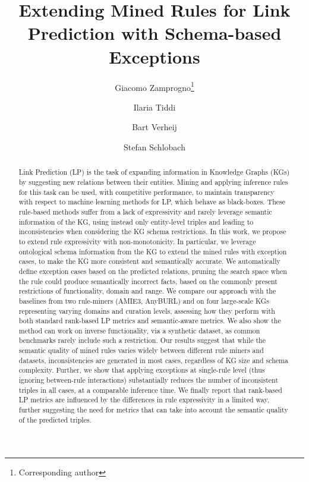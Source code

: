 \documentclass[a4paper,UKenglish,cleveref, autoref, thm-restate]{tgdk-v2021}
\title{Extending Mined Rules for Link Prediction with Schema-based Exceptions}
\author{Giacomo {Zamprogno}\footnote{Corresponding author}}{Vrije Universiteit Amsterdam, The Netherlands}{g.zamprogno@vu.nl}{https://orcid.org/0009-0009-6474-1987}{This work is supported by the Hybrid Intelligence programme (https://www.hybrid-intelligence-centre.nl/), funded by a 10-year Zwaartekracht grant from the Dutch Ministry of Education, Culture and Science (NWO).}%
\author{Ilaria Tiddi}{Vrije Universiteit Amsterdam, The Netherlands}{i.tiddi@vu.nl}{https://orcid.org/0000-0001-7116-9338}{}
\author{Bart Verheij}{University of Groningen, The Netherlands}{Bart.Verheij@rug.nl}{https://orcid.org/0000-0001-8927-8751}{}
\author{Stefan Schlobach}{Vrije Universiteit Amsterdam, The Netherlands}{k.s.schlobach@vu.nl}{https://orcid.org/0000-0002-3282-1597}{}
\begin{document}
\maketitle

\begin{abstract}
Link Prediction (LP) is the task of expanding information in Knowledge Graphs (KGs) by suggesting new relations between their entities. Mining and applying inference rules for this task can be used, with competitive performance, to maintain transparency with respect to machine learning methods for LP, which behave as black-boxes. These rule-based methods suffer from a lack of expressivity and rarely leverage semantic information of the KG, using instead only entity-level triples and leading to inconsistencies when considering the KG schema restrictions.
In this work, we propose to extend rule expressivity with non-monotonicity. In particular, we leverage ontological schema information from the KG to extend the mined rules with exception cases, to make the KG more consistent and semantically accurate. We automatically define exception cases based on the predicted relations, pruning the search space when the rule could produce semantically incorrect facts, based on the commonly present restrictions of functionality, domain and range. 
We compare our approach with the baselines from two rule-miners (AMIE3, AnyBURL) and on four large-scale KGs representing varying domains and curation levels, assessing how they perform with both standard rank-based LP metrics and semantic-aware metrics. We also show the method can work on inverse functionality, via a synthetic dataset, as common benchmarks rarely include such a restriction.  
Our results suggest that while the semantic quality of mined rules varies widely between different rule miners and datasets, inconsistencies are generated in most cases, regardless of KG size and schema complexity. Further, we show that applying exceptions at single-rule level (thus ignoring between-rule interactions) substantially reduces the number of inconsistent triples in all cases, at a comparable inference time. We finally report that rank-based LP metrics are influenced by the differences in rule expressivity in a limited way, further suggesting the need for metrics that can take into account the semantic quality of the predicted triples.
\end{abstract}
\end{document}

